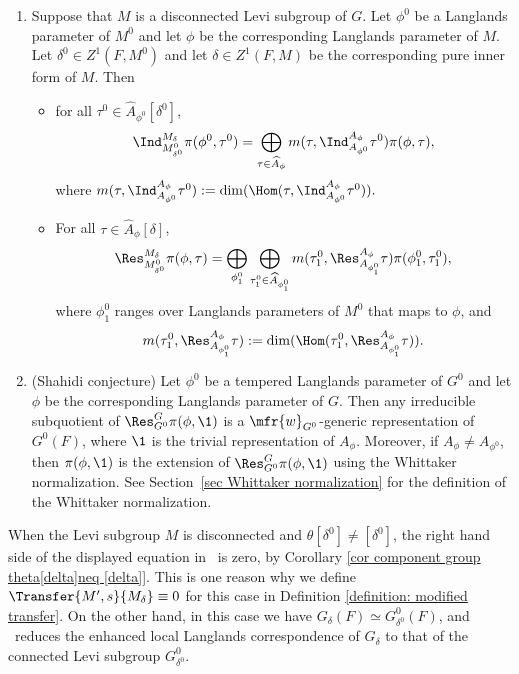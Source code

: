 \documentclass[11pt,letterpaper]{amsart}
\numberwithin{equation}{section}
\begin{document}
\begin{desideratum}
\begin{enumerate}
    \item [\RES] Suppose that $M$ is a disconnected Levi subgroup of $G$. Let  $\phi^0$ be a Langlands parameter of $M^0$ and let $\phi$ be the corresponding Langlands parameter of $M$. Let $\delta^0\in Z^1(F,M^0)$ and let $\delta \in Z^1(F,M)$ be the corresponding pure inner form of $M$. Then
    \begin{itemize}
        \item for all $\tau^0 \in \widehat{A}_{\phi^0}[\delta^0]$,
        \[ \Ind_{M^0_{\delta^0}}^{M_{\delta}} \pi(\phi^0, \tau^0)= \bigoplus_{\tau \in \widehat{A}_{\phi}} m(\tau, \Ind_{A_{\phi^0}}^{{A_{\phi}}}\tau^0) \pi(\phi,\tau),\]
      where $m(\tau, \Ind_{A_{\phi^0}}^{{A_{\phi}}}\tau^0):= \dim(\Hom(\tau, \Ind_{A_{\phi^0}}^{{A_{\phi}}}\tau^0) ).$
        \item For all $\tau \in \widehat{A}_{\phi}[\delta]$,
\[  
        \Res_{M^0_{\delta^0}}^{M_{\delta}} \pi(\phi, \tau)= \bigoplus_{\phi^0_1} \bigoplus_{\tau^0_1 \in \widehat{A}_{\phi^0_1}} m(\tau_{1}^0, \Res_{A_{\phi^0_1}}^{{A_{\phi}}}\tau) \pi(\phi^0_1,\tau^0_1),
        \]
        where $\phi^0_1$ ranges over Langlands parameters of $M^0$ that maps to $\phi$, and 
        \[
        m(\tau_{1}^0, \Res_{A_{\phi^0_1}}^{{A_{\phi}}}\tau):= \dim(\Hom ( \tau^0_1, \Res_{A_{\phi^0_1}}^{{A_{\phi}}}\tau)).
        \]
    \end{itemize}


 \item [\Sha]
    (Shahidi conjecture) 
    Let  $\phi^0$ be a tempered Langlands parameter of $G^0$ and let $\phi$ be the corresponding Langlands parameter of $G$. Then any irreducible subquotient of $\Res_{G^0}^G \pi(\phi,\1)$ is a $\mfr{w}_{G^0}$-generic representation of $G^0(F)$, where $\1$ is the trivial representation of $A_\phi$. Moreover, if $A_{\phi} \neq A_{\phi^0}$, then $\pi(\phi,\1)$ is the extension of $\Res_{G^0}^G \pi(\phi,\1)$ using the Whittaker normalization. See Section~\ref{sec Whittaker normalization} for the definition of the Whittaker normalization.
\end{enumerate}
\end{desideratum}




\begin{remark}\label{rmk LLC(1)}
When the Levi subgroup $M$ is disconnected and $\theta[\delta^0] \neq [\delta^0]$, the right hand side of the displayed equation in \ECR\ is zero, by Corollary \ref{cor component group theta[delta]neq [delta]}. This is one reason why we define $ \Transfer{M',s}{M_{\delta}} \equiv 0$ for this case in Definition \ref{definition: modified transfer}. On the other hand, in this case we have $G_{\delta}(F) \simeq G^0_{\delta^0}(F)$, and \RES\  reduces the enhanced local Langlands correspondence of $G_{\delta}$ to that of the connected Levi subgroup $G^0_{\delta^0}$. 
\end{remark}
\end{document}
